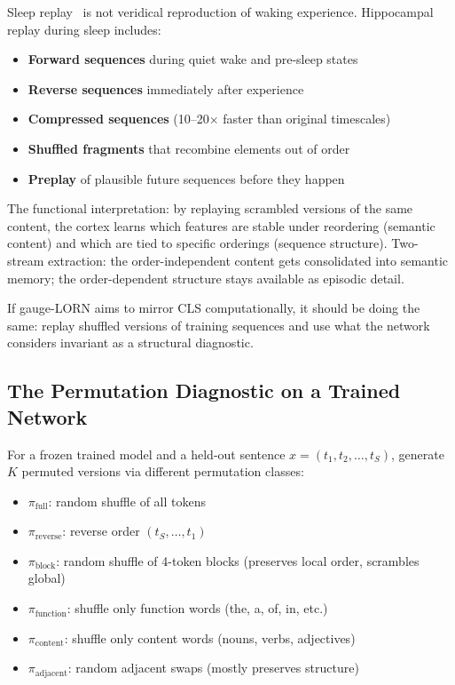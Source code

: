 \documentclass[11pt, a4paper]{article}
\theoremstyle{plain}
\theoremstyle{definition}
\theoremstyle{remark}
\begin{document}
Sleep replay~\cite{wilson1994reactivation, buzsaki2015swr, diekelmann2010sleep} is not veridical reproduction of waking experience.
Hippocampal replay during sleep includes:
\begin{itemize}[nosep]
\item \textbf{Forward sequences} during quiet wake and pre-sleep states
\item \textbf{Reverse sequences} immediately after experience
\item \textbf{Compressed sequences} (10--20$\times$ faster than original timescales)
\item \textbf{Shuffled fragments} that recombine elements out of order
\item \textbf{Preplay} of plausible future sequences before they happen
\end{itemize}

The functional interpretation: by replaying scrambled versions of the same content, the cortex learns which features are stable under reordering (semantic content) and which are tied to specific orderings (sequence structure).
Two-stream extraction: the order-independent content gets consolidated into semantic memory; the order-dependent structure stays available as episodic detail.

If gauge-LORN aims to mirror CLS computationally, it should be doing the same: replay shuffled versions of training sequences and use what the network considers invariant as a structural diagnostic.

\subsection{The Permutation Diagnostic on a Trained Network}

For a frozen trained model and a held-out sentence $x = (t_1, t_2, \ldots, t_S)$, generate $K$ permuted versions via different permutation classes:

\begin{itemize}[nosep]
\item $\pi_{\text{full}}$: random shuffle of all tokens
\item $\pi_{\text{reverse}}$: reverse order $(t_S, \ldots, t_1)$
\item $\pi_{\text{block}}$: random shuffle of 4-token blocks (preserves local order, scrambles global)
\item $\pi_{\text{function}}$: shuffle only function words (the, a, of, in, etc.)
\item $\pi_{\text{content}}$: shuffle only content words (nouns, verbs, adjectives)
\item $\pi_{\text{adjacent}}$: random adjacent swaps (mostly preserves structure)
\end{itemize}
\end{document}
